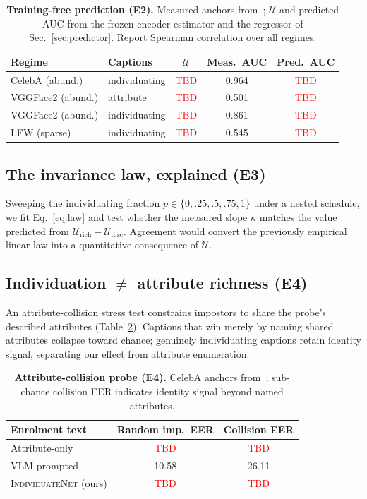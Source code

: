 \documentclass[10pt,twocolumn,letterpaper]{article}
\newcommand{\U}{\mathcal{U}}
\newcommand{\method}{\textsc{IndividuateNet}}
\newcommand{\tbd}{\textcolor{red}{\footnotesize TBD}}
\begin{document}
\begin{table}[t]
  \centering\small
  \setlength{\tabcolsep}{4pt}
  \begin{tabular}{@{}llccc@{}}
    \toprule
    \textbf{Regime} & \textbf{Captions} & $\U$ & \textbf{Meas.\ AUC} & \textbf{Pred.\ AUC} \\
    \midrule
    CelebA (abund.)   & individuating & \tbd & 0.964 & \tbd \\
    VGGFace2 (abund.) & attribute     & \tbd & 0.501 & \tbd \\
    VGGFace2 (abund.) & individuating & \tbd & 0.861 & \tbd \\
    LFW (sparse)      & individuating & \tbd & 0.545 & \tbd \\
    \bottomrule
  \end{tabular}
  \caption{\textbf{Training-free prediction (E2).} Measured anchors from~\cite{semanticbio};
  $\U$ and predicted AUC from the frozen-encoder estimator and the regressor of
  Sec.~\ref{sec:predictor}. Report Spearman correlation over all regimes.}
  \label{tab:predict}
\end{table}

\subsection{The invariance law, explained (E3)}
\label{sec:e3}
Sweeping the individuating fraction $p\in\{0,.25,.5,.75,1\}$ under a nested schedule, we fit
Eq.~\ref{eq:law} and test whether the measured slope $\kappa$ matches the value predicted from
$\U_{\text{rich}}-\U_{\text{disc}}$. Agreement would convert the previously empirical linear law
into a quantitative consequence of $\U$.

\subsection{Individuation $\neq$ attribute richness (E4)}
\label{sec:e4}
An attribute-collision stress test constrains impostors to share the probe's described
attributes (Table~\ref{tab:collision}). Captions that win merely by naming shared attributes
collapse toward chance; genuinely individuating captions retain identity signal, separating our
effect from attribute enumeration.

\begin{table}[t]
  \centering\small
  \setlength{\tabcolsep}{5pt}
  \begin{tabular}{@{}lcc@{}}
    \toprule
    \textbf{Enrolment text} & \textbf{Random imp.\ EER} & \textbf{Collision EER} \\
    \midrule
    Attribute-only     & \tbd  & \tbd  \\
    VLM-prompted       & 10.58 & 26.11 \\
    \method{} (ours)   & \tbd  & \tbd  \\
    \bottomrule
  \end{tabular}
  \caption{\textbf{Attribute-collision probe (E4).} CelebA anchors from~\cite{semanticbio};
  sub-chance collision EER indicates identity signal beyond named attributes.}
  \label{tab:collision}
\end{table}
\end{document}
